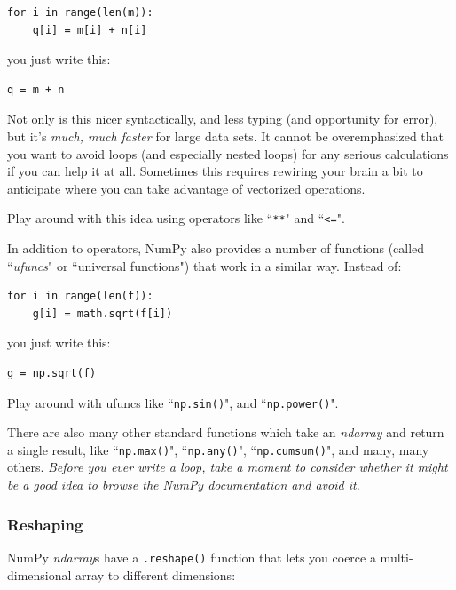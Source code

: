 \documentclass[12pt]{article}
\begin{document}
\begin{Verbatim}[fontsize=small,samepage=true,frame=none]
for i in range(len(m)):
    q[i] = m[i] + n[i]
\end{Verbatim}

you just write this:

\begin{Verbatim}[fontsize=small,samepage=true,frame=none]
q = m + n
\end{Verbatim}

Not only is this nicer syntactically, and less typing (and opportunity for
error), but it's \textit{much, much faster} for large data sets. It cannot be
overemphasized that you want to avoid loops (and especially nested loops) for
any serious calculations if you can help it at all. Sometimes this requires
rewiring your brain a bit to anticipate where you can take advantage of
vectorized operations.

Play around with this idea using operators like ``\texttt{**}" and
``\texttt{<=}".

In addition to operators, NumPy also provides a number of functions (called
``\textit{ufuncs}" or ``universal functions") that work in a similar way.
Instead of:

\begin{Verbatim}[fontsize=small,samepage=true,frame=none]
for i in range(len(f)):
    g[i] = math.sqrt(f[i])
\end{Verbatim}

you just write this:

\begin{Verbatim}[fontsize=small,samepage=true,frame=none]
g = np.sqrt(f)
\end{Verbatim}

Play around with ufuncs like ``\texttt{np.sin()}", and ``\texttt{np.power()}".

There are also many other standard functions which take an \textit{ndarray}
and return a single result, like ``\texttt{np.max()}", ``\texttt{np.any()}",
``\texttt{np.cumsum()}", and many, many others. \textit{Before you ever write
a loop, take a moment to consider whether it might be a good idea to browse
the NumPy documentation and avoid it.}

\subsubsection{Reshaping}

NumPy \textit{ndarray}s have a \texttt{.reshape()} function that lets you
coerce a multi-dimensional array to different dimensions:
\end{document}
